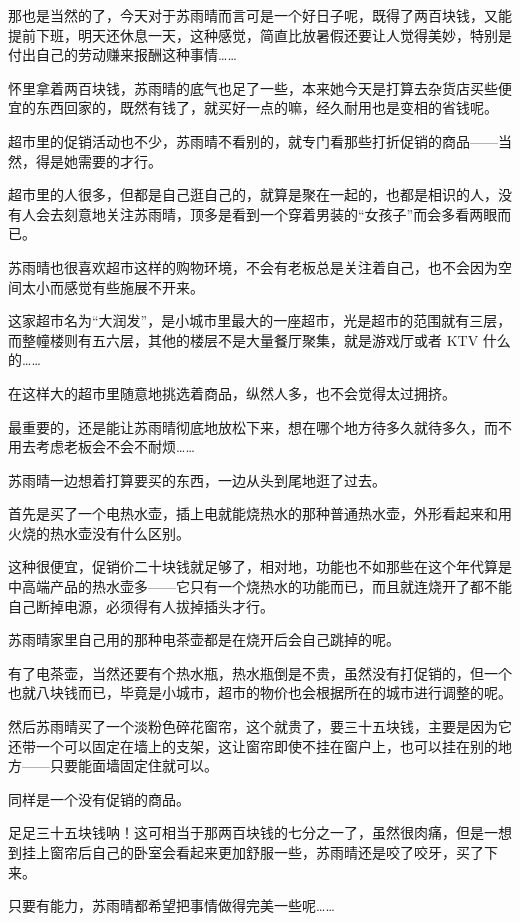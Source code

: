 那也是当然的了，今天对于苏雨晴而言可是一个好日子呢，既得了两百块钱，又能提前下班，明天还休息一天，这种感觉，简直比放暑假还要让人觉得美妙，特别是付出自己的劳动赚来报酬这种事情……

怀里拿着两百块钱，苏雨晴的底气也足了一些，本来她今天是打算去杂货店买些便宜的东西回家的，既然有钱了，就买好一点的嘛，经久耐用也是变相的省钱呢。

超市里的促销活动也不少，苏雨晴不看别的，就专门看那些打折促销的商品——当然，得是她需要的才行。

超市里的人很多，但都是自己逛自己的，就算是聚在一起的，也都是相识的人，没有人会去刻意地关注苏雨晴，顶多是看到一个穿着男装的“女孩子”而会多看两眼而已。

苏雨晴也很喜欢超市这样的购物环境，不会有老板总是关注着自己，也不会因为空间太小而感觉有些施展不开来。

这家超市名为“大润发”，是小城市里最大的一座超市，光是超市的范围就有三层，而整幢楼则有五六层，其他的楼层不是大量餐厅聚集，就是游戏厅或者 KTV 什么的……

在这样大的超市里随意地挑选着商品，纵然人多，也不会觉得太过拥挤。

最重要的，还是能让苏雨晴彻底地放松下来，想在哪个地方待多久就待多久，而不用去考虑老板会不会不耐烦……

苏雨晴一边想着打算要买的东西，一边从头到尾地逛了过去。

首先是买了一个电热水壶，插上电就能烧热水的那种普通热水壶，外形看起来和用火烧的热水壶没有什么区别。

这种很便宜，促销价二十块钱就足够了，相对地，功能也不如那些在这个年代算是中高端产品的热水壶多——它只有一个烧热水的功能而已，而且就连烧开了都不能自己断掉电源，必须得有人拔掉插头才行。

苏雨晴家里自己用的那种电茶壶都是在烧开后会自己跳掉的呢。

有了电茶壶，当然还要有个热水瓶，热水瓶倒是不贵，虽然没有打促销的，但一个也就八块钱而已，毕竟是小城市，超市的物价也会根据所在的城市进行调整的呢。

然后苏雨晴买了一个淡粉色碎花窗帘，这个就贵了，要三十五块钱，主要是因为它还带一个可以固定在墙上的支架，这让窗帘即使不挂在窗户上，也可以挂在别的地方——只要能面墙固定住就可以。

同样是一个没有促销的商品。

足足三十五块钱呐！这可相当于那两百块钱的七分之一了，虽然很肉痛，但是一想到挂上窗帘后自己的卧室会看起来更加舒服一些，苏雨晴还是咬了咬牙，买了下来。

只要有能力，苏雨晴都希望把事情做得完美一些呢……

